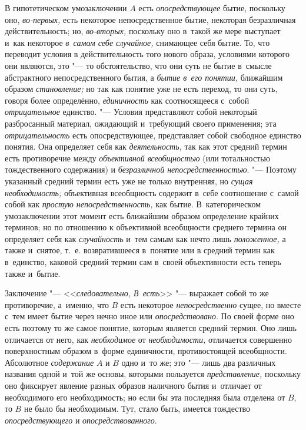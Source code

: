 В гипотетическом умозаключении $A$ есть
{\em опосредствующее} бытие, поскольку оно, {\em во-первых,} есть
некоторое непосредственное бытие, некоторая безразличная действительность;
но, {\em во-вторых,} поскольку оно в~такой же мере выступает и~как некоторое
{\em в~самом себе случайное,}
снимающее себя бытие. То, что переводит условия в
действительность того нового образа, условиями которого они являются, это
"--- то обстоятельство, что они суть не бытие в~смысле
абстрактного непосредственного бытия, а
{\em бытие в~его понятии,} ближайшим образом {\em становление;} но так
как понятие уже не есть переход, то они суть, говоря более определённо,
{\em единичность} как
соотносящееся с~собой {\em отрицательное} единство. "--- Условия
представляют собой некоторый разбросанный материал,
ожидающий и~требующий своего применения; эта {\em отрицательность}
есть опосредствующее, представляет собой свободное единство
понятия. Она определяет себя как {\em деятельность,} так
как этот средний термин есть противоречие между
{\em объективной всеобщностью}
(или тотальностью тождественного содержания) и
{\em безразличной непосредственностью}.
"--- Поэтому указанный средний термин есть уже не только
внутренняя, но {\em сущая необходимость;} объективная всеобщность содержит
в~себе соотношение с~самой собой как {\em простую непосредственность,}
как бытие. В~категорическом умозаключении этот момент есть
ближайшим образом определение крайних терминов; но по отношению к
объективной всеобщности среднего термина он определяет себя как
{\em случайность} и~тем самым как нечто лишь {\em положенное,}
а также и~снятое, т.~е. возвратившееся в~понятие или в
средний термин как в~единство, каковой средний термин сам в~своей
объективности есть теперь также и~бытие.

Заключение "--- <<{\em следовательно, В~есть}>>
"--- выражает собой то же противоречие, а~именно, что
$B$ есть некоторое {\em непосредственно}
сущее, но вместе с~тем имеет бытие через нечно иное или
{\em опосредствовано}.
По своей форме оно есть поэтому то же самое понятие, которым
является средний термин. Оно лишь отличается от него, как
{\em необходимое} от {\em необходимости,}
отличается совершенно поверхностным образом в~форме
единичности, противостоящей всеобщности. Абсолютное
{\em содержание} $A$ и $B$ одно и~то же;
это "--- лишь два различных названия одной и~той же основы,
которыми пользуется {\em представление,}
поскольку оно фиксирует явление разных образов наличного
бытия и~отличает от необходимого его необходимость; но если бы эта
последняя была отделена от $B$, то $B$ не было бы необходимым.
Тут, стало быть, имеется тождество {\em опосредствующего} и
{\em опосредствованного}.

